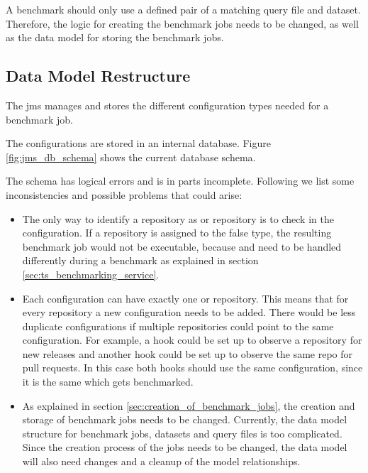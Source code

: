 A benchmark should only use a defined pair of a matching query file and dataset.
Therefore, the logic for creating the benchmark jobs needs to be changed, as well as the data model for storing the benchmark jobs.


\subsection{Data Model Restructure}
\label{sec:review_data_model}
The \ac{jms} manages and stores the different configuration types needed for a benchmark job.

The configurations are stored in an internal database.
Figure \ref{fig:jms_db_schema} shows the current database schema.

The schema has logical errors and is in parts incomplete.
Following we list some inconsistencies and possible problems that could arise:
\begin{itemize}
	\item The only way to identify a repository as \gh{} or \dockh{} repository is to check in the \ts{} configuration.
		If a repository is assigned to the false type, the resulting benchmark job would not be executable, because \gh{} and \dockh{} need to be handled differently during a benchmark as explained in section \ref{sec:ts_benchmarking_service}.
	
	\item Each \ts{} configuration can have exactly one \gh{} or \dockh{} repository.
		This means that for every repository a new \ts{} configuration needs to be added.
		There would be less duplicate configurations if multiple repositories could point to the same configuration.
		For example, a hook could be set up to observe a \gh{} repository for new releases and another hook could be set up to observe the same \gh{} repo for pull requests.
		In this case both hooks should use the same \ts{} configuration, since it is the same \ts{} which gets benchmarked.
		
	\item As explained in section \ref{sec:creation_of_benchmark_jobs}, the 	creation and storage of benchmark jobs needs to be changed.
		Currently, the data model structure for benchmark jobs, datasets and query files is too complicated.
		Since the creation process of the jobs needs to be changed, the data model will also need changes and a cleanup of the model relationships.
	
\end{itemize} 

